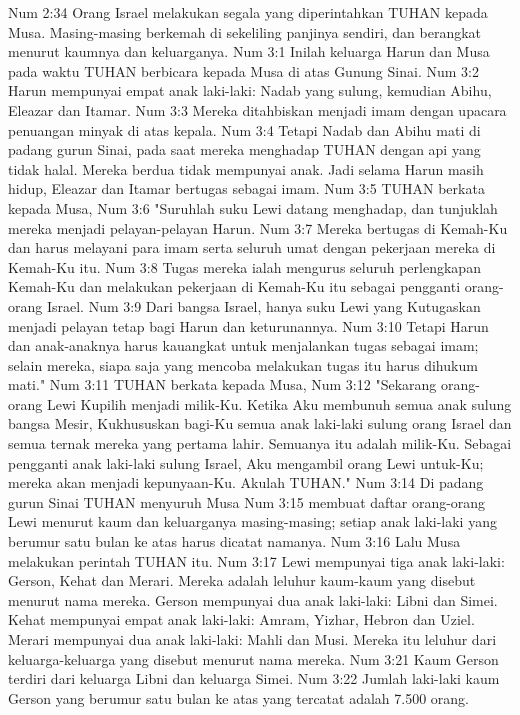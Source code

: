 Num 2:34  Orang Israel melakukan segala yang diperintahkan TUHAN kepada Musa. Masing-masing berkemah di sekeliling panjinya sendiri, dan berangkat menurut kaumnya dan keluarganya.
Num 3:1  Inilah keluarga Harun dan Musa pada waktu TUHAN berbicara kepada Musa di atas Gunung Sinai.
Num 3:2  Harun mempunyai empat anak laki-laki: Nadab yang sulung, kemudian Abihu, Eleazar dan Itamar.
Num 3:3  Mereka ditahbiskan menjadi imam dengan upacara penuangan minyak di atas kepala.
Num 3:4  Tetapi Nadab dan Abihu mati di padang gurun Sinai, pada saat mereka menghadap TUHAN dengan api yang tidak halal. Mereka berdua tidak mempunyai anak. Jadi selama Harun masih hidup, Eleazar dan Itamar bertugas sebagai imam.
Num 3:5  TUHAN berkata kepada Musa,
Num 3:6  "Suruhlah suku Lewi datang menghadap, dan tunjuklah mereka menjadi pelayan-pelayan Harun.
Num 3:7  Mereka bertugas di Kemah-Ku dan harus melayani para imam serta seluruh umat dengan pekerjaan mereka di Kemah-Ku itu.
Num 3:8  Tugas mereka ialah mengurus seluruh perlengkapan Kemah-Ku dan melakukan pekerjaan di Kemah-Ku itu sebagai pengganti orang-orang Israel.
Num 3:9  Dari bangsa Israel, hanya suku Lewi yang Kutugaskan menjadi pelayan tetap bagi Harun dan keturunannya.
Num 3:10  Tetapi Harun dan anak-anaknya harus kauangkat untuk menjalankan tugas sebagai imam; selain mereka, siapa saja yang mencoba melakukan tugas itu harus dihukum mati."
Num 3:11  TUHAN berkata kepada Musa,
Num 3:12  "Sekarang orang-orang Lewi Kupilih menjadi milik-Ku. Ketika Aku membunuh semua anak sulung bangsa Mesir, Kukhususkan bagi-Ku semua anak laki-laki sulung orang Israel dan semua ternak mereka yang pertama lahir. Semuanya itu adalah milik-Ku. Sebagai pengganti anak laki-laki sulung Israel, Aku mengambil orang Lewi untuk-Ku; mereka akan menjadi kepunyaan-Ku. Akulah TUHAN."
Num 3:14  Di padang gurun Sinai TUHAN menyuruh Musa
Num 3:15  membuat daftar orang-orang Lewi menurut kaum dan keluarganya masing-masing; setiap anak laki-laki yang berumur satu bulan ke atas harus dicatat namanya.
Num 3:16  Lalu Musa melakukan perintah TUHAN itu.
Num 3:17  Lewi mempunyai tiga anak laki-laki: Gerson, Kehat dan Merari. Mereka adalah leluhur kaum-kaum yang disebut menurut nama mereka. Gerson mempunyai dua anak laki-laki: Libni dan Simei. Kehat mempunyai empat anak laki-laki: Amram, Yizhar, Hebron dan Uziel. Merari mempunyai dua anak laki-laki: Mahli dan Musi. Mereka itu leluhur dari keluarga-keluarga yang disebut menurut nama mereka.
Num 3:21  Kaum Gerson terdiri dari keluarga Libni dan keluarga Simei.
Num 3:22  Jumlah laki-laki kaum Gerson yang berumur satu bulan ke atas yang tercatat adalah 7.500 orang.
